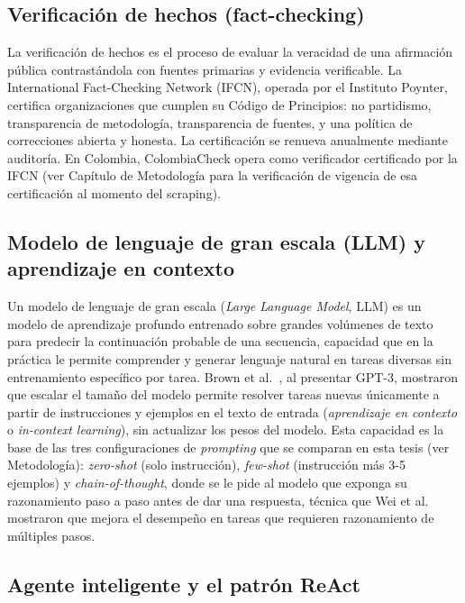 \subsection{Verificación de hechos (fact-checking)}

La verificación de hechos es el proceso de evaluar la veracidad de una afirmación pública contrastándola con fuentes primarias y evidencia verificable. La International Fact-Checking Network (IFCN), operada por el Instituto Poynter, certifica organizaciones que cumplen su Código de Principios: no partidismo, transparencia de metodología, transparencia de fuentes, y una política de correcciones abierta y honesta. La certificación se renueva anualmente mediante auditoría. En Colombia, ColombiaCheck opera como verificador certificado por la IFCN (ver Capítulo de Metodología para la verificación de vigencia de esa certificación al momento del scraping).

\subsection{Modelo de lenguaje de gran escala (LLM) y aprendizaje en contexto}

Un modelo de lenguaje de gran escala (\textit{Large Language Model}, LLM) es un modelo de aprendizaje profundo entrenado sobre grandes volúmenes de texto para predecir la continuación probable de una secuencia, capacidad que en la práctica le permite comprender y generar lenguaje natural en tareas diversas sin entrenamiento específico por tarea. Brown et al.~\cite{Brown2020}, al presentar GPT-3, mostraron que escalar el tamaño del modelo permite resolver tareas nuevas únicamente a partir de instrucciones y ejemplos en el texto de entrada (\textit{aprendizaje en contexto} o \textit{in-context learning}), sin actualizar los pesos del modelo. Esta capacidad es la base de las tres configuraciones de \textit{prompting} que se comparan en esta tesis (ver Metodología): \textit{zero-shot} (solo instrucción), \textit{few-shot} (instrucción más 3-5 ejemplos) y \textit{chain-of-thought}, donde se le pide al modelo que exponga su razonamiento paso a paso antes de dar una respuesta, técnica que Wei et al.~\cite{Wei2022} mostraron que mejora el desempeño en tareas que requieren razonamiento de múltiples pasos.

\subsection{Agente inteligente y el patrón ReAct}

